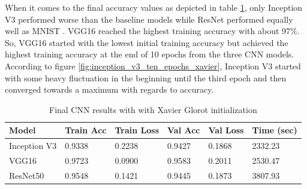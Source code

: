 \documentclass{article}
\theoremstyle{definition}
\theoremstyle{remark}
\begin{document}
When it comes to the final accuracy values as depicted in table \ref{tab:final_cnn_results_xavier}, only Inception V3 performed worse than the baseline models while ResNet performed equally well as MNIST . VGG16 reached the highest training accuracy with about 97\%. So, VGG16 started with the lowest initial training accuracy but achieved the highest training accuracy at the end of 10 epochs from the three CNN models.\\
According to figure \ref{fig:inception_v3_ten_epochs_xavier}, Inception V3 started with some heavy fluctuation in the beginning until the third epoch and then converged towards a maximum with regards to accuracy. 

\begin{table}[h!]
\center
\begin{tabular}{|l|l|l|l|l|l|}
\hline
\textbf{Model} & \textbf{Train Acc} & \textbf{Train Loss} & \textbf{Val Acc} & \textbf{Val Loss} & \textbf{Time (sec)}\\ \hline
Inception V3	& 0.9338 & 0.2238  & 0.9427	& 0.1868 &	2332.23\\ \hline
VGG16  		& 0.9723   & 0.0900   & 0.9583	&	0.2011 &  2530.47\\ \hline
ResNet50  	& 0.9548  & 0.1421 	& 0.9445 &	0.1873	 &  3807.93\\ \hline
\end{tabular}
\caption{Final CNN results with with Xavier Glorot initialization}
\label{tab:final_cnn_results_xavier}
\end{table}


\newpage
\end{document}
